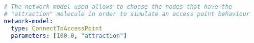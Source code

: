 \begin{lstlisting}[language=yaml, label={lst:linking}, caption=Defining the linking rule: only nodes with the molecule \texttt{attraction} will connect to other nodes within a radius of 100 meters.]
# The network model used allows to choose the nodes that have the
# "attraction" molecule in order to simulate an access point behaviour
network-model:
  type: ConnectToAccessPoint
  parameters: [100.0, "attraction"]
\end{lstlisting}

